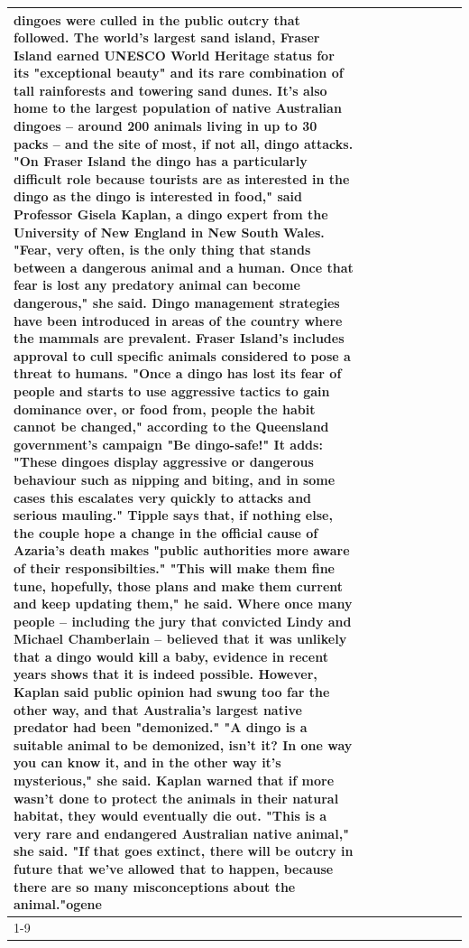 \begin{table}[H]
\begin{tabular}{lllrlllll}
dingoes were culled in the public outcry that followed. The world's largest sand island, Fraser Island earned UNESCO World Heritage status for its "exceptional beauty" and its rare combination of tall rainforests and towering sand dunes. It's also home to the largest population of native Australian dingoes -- around 200 animals living in up to 30 packs -- and the site of most, if not all, dingo attacks. "On Fraser Island the dingo has a particularly difficult role because tourists are as interested in the dingo as the dingo is interested in food," said Professor Gisela Kaplan, a dingo expert from the University of New England in New South Wales. "Fear, very often, is the only thing that stands between a dangerous animal and a human. Once that fear is lost any predatory animal can become dangerous," she said. Dingo management strategies have been introduced in areas of the country where the mammals are prevalent. Fraser Island's includes approval to cull specific animals considered to pose a threat to humans. "Once a dingo has lost its fear of people and starts to use aggressive tactics to gain dominance over, or food from, people the habit cannot be changed," according to the Queensland government's campaign "Be dingo-safe!" It adds: "These dingoes display aggressive or dangerous behaviour such as nipping and biting, and in some cases this escalates very quickly to attacks and serious mauling." Tipple says that, if nothing else, the couple hope a change in the official cause of Azaria's death makes "public authorities more aware of their responsibilties." "This will make them fine tune, hopefully, those plans and make them current and keep updating them," he said. Where once many people -- including the jury that convicted Lindy and Michael Chamberlain -- believed that it was unlikely that a dingo would kill a baby, evidence in recent years shows that it is indeed possible. However, Kaplan said public opinion had swung too far the other way, and that Australia's largest native predator had been "demonized." "A dingo is a suitable animal to be demonized, isn't it? In one way you can know it, and in the other way it's mysterious," she said. Kaplan warned that if more wasn't done to protect the animals in their natural habitat, they would eventually die out. "This is a very rare and endangered Australian native animal," she said. "If that goes extinct, there will be outcry in future that we've allowed that to happen, because there are so many misconceptions about the animal."ogene \\
\cline{1-9}

\end{tabular}
\end{table}
